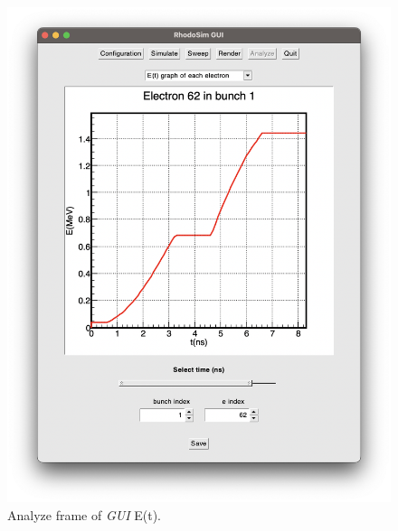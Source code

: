 \documentclass[a4paper,oneside,12pt]{report}
\numberwithin{equation}{chapter}
\begin{document}
{\begin{figure}
    \centering
    \includegraphics[width=\linewidth]{./figures/rhodoSim/GUI_analyze_Et_2.png}
    \caption{Analyze frame of \textit{GUI} E(t).}
    \label{fig:gui_analyze_Et2}
\end{figure}

}
\end{document}
